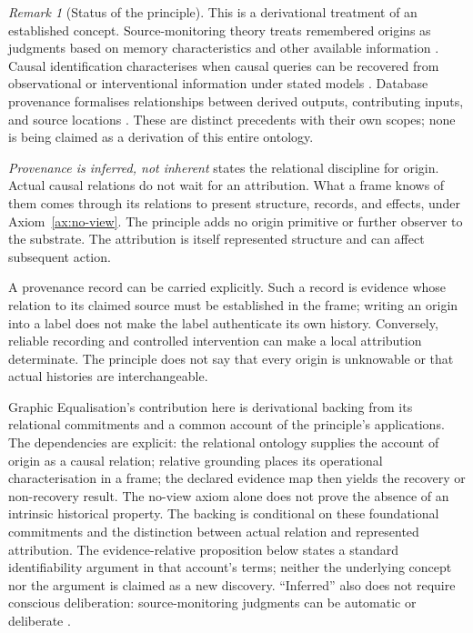\documentclass[11pt,a4paper]{article}
\theoremstyle{remark}\newtheorem{remark}[definition]{Remark}
\begin{document}
\begin{remark}[Status of the principle]\label{rem:provenance-status}
This is a derivational treatment of an established concept. Source-monitoring
theory treats remembered origins as judgments based on memory characteristics
and other available information \citep{johnson1993}. Causal identification
characterises when causal queries can be recovered from observational or
interventional information under stated models \citep{shpitserpearl2008}.
Database provenance formalises relationships between derived outputs,
contributing inputs, and source locations \citep{buneman2001}. These are
distinct precedents with their own scopes; none is being claimed as a
derivation of this entire ontology.

\emph{Provenance is inferred, not inherent} states the relational discipline
for origin. Actual causal relations do not wait for an attribution. What a
frame knows of them comes through its relations to present structure,
records, and effects, under Axiom~\ref{ax:no-view}. The principle adds no
origin primitive or further observer to the substrate. The attribution is
itself represented structure and can affect subsequent action.

A provenance record can be carried explicitly. Such a record is evidence
whose relation to its claimed source must be established in the frame;
writing an origin into a label does not make the label authenticate its own
history. Conversely, reliable recording and controlled intervention can
make a local attribution determinate. The principle does not say that
every origin is unknowable or that actual histories are interchangeable.

Graphic Equalisation's contribution here is derivational backing from its
relational commitments and a common account of the principle's applications.
The dependencies are explicit: the relational ontology supplies the account
of origin as a causal relation; relative grounding places its operational
characterisation in a frame; the declared evidence map then yields the
recovery or non-recovery result. The no-view axiom alone does not prove the
absence of an intrinsic historical property. The backing is conditional on
these foundational commitments and the distinction between actual relation
and represented attribution.
The evidence-relative proposition below states a standard identifiability
argument in that account's terms; neither the underlying concept nor the
argument is claimed as a new discovery. ``Inferred'' also does not require
conscious deliberation: source-monitoring judgments can be automatic or
deliberate \citep{johnson1993}.
\end{remark}
\end{document}
